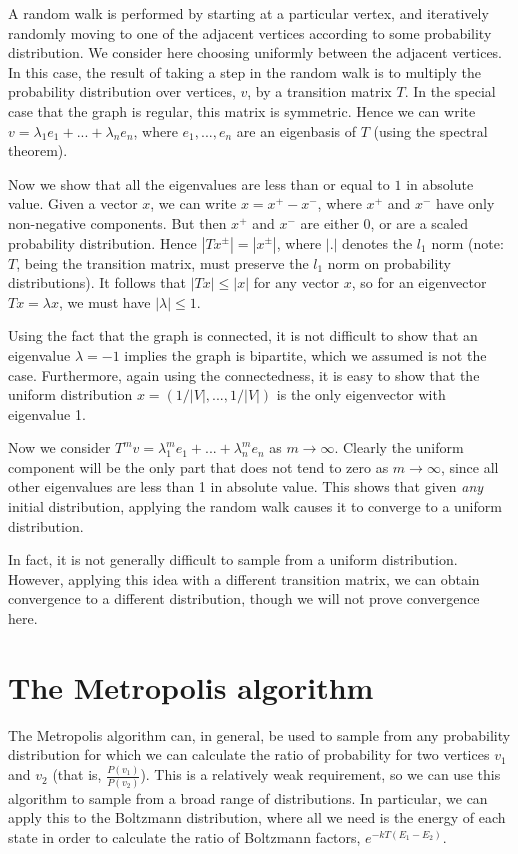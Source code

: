 \documentclass{article}
\begin{document}
A random walk is performed by starting at a particular vertex, and iteratively randomly moving to one of the adjacent vertices according to some probability distribution.
We consider here choosing uniformly between the adjacent vertices.
In this case, the result of taking a step in the random walk is to multiply the probability distribution over vertices, $v$, by a transition matrix $T$.
In the special case that the graph is regular, this matrix is symmetric.
Hence we can write $v = \lambda_1e_1 + ... + \lambda_ne_n$, where $e_1, ..., e_n$ are an eigenbasis of $T$ (using the spectral theorem).

Now we show that all the eigenvalues are less than or equal to $1$ in absolute value.
Given a vector $x$, we can write $x = x^+ - x^-$, where $x^+$ and $x^-$ have only non-negative components.
But then $x^+$ and $x^-$ are either 0, or are a scaled probability distribution.
Hence $|Tx^\pm| = |x^\pm|$, where $|.|$ denotes the $l_1$ norm (note: $T$, being the transition matrix, must preserve the $l_1$ norm on probability distributions).
It follows that $|Tx| \leq |x|$ for any vector $x$, so for an eigenvector $Tx = \lambda x$, we must have $|\lambda| \leq 1$.

Using the fact that the graph is connected, it is not difficult to show that an eigenvalue $\lambda = -1$ implies the graph is bipartite, which we assumed is not the case.
Furthermore, again using the connectedness, it is easy to show that the uniform distribution $x = (1/|V|, ..., 1/|V|)$ is the only eigenvector with eigenvalue 1.

Now we consider $T^mv = \lambda_1^me_1 + ... + \lambda_n^me_n$ as $m\rightarrow\infty$.
Clearly the uniform component will be the only part that does not tend to zero as $m\rightarrow\infty$, since all other eigenvalues are less than 1 in absolute value.
This shows that given \emph{any} initial distribution, applying the random walk causes it to converge to a uniform distribution.

In fact, it is not generally difficult to sample from a uniform distribution.
However, applying this idea with a different transition matrix, we can obtain convergence to a different distribution, though we will not prove convergence here.

\section{The Metropolis algorithm}
The Metropolis algorithm can, in general, be used to sample from any probability distribution for which we can calculate the ratio of probability for two vertices $v_1$ and $v_2$ (that is, $\frac{P(v_1)}{P(v_2)}$).
This is a relatively weak requirement, so we can use this algorithm to sample from a broad range of distributions.
In particular, we can apply this to the Boltzmann distribution, where all we need is the energy of each state in order to calculate the ratio of Boltzmann factors, $e^{-kT(E_1-E_2)}$.
\end{document}
